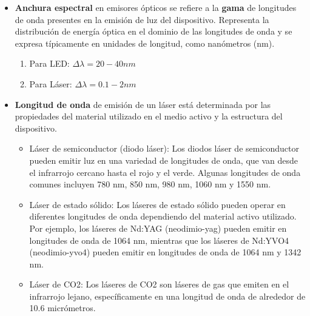 \documentclass[
	12pt, %
	fleqn, %
	a4paper, %
	oneside, %
]{LegrandOrangeBook}
\begin{document}
\begin{itemize}
\item \textbf{Anchura espectral} en emisores ópticos se refiere a la \textbf{gama} de longitudes de onda presentes en la emisión de luz del dispositivo. Representa la distribución de energía óptica en el dominio de las longitudes de onda y se expresa típicamente en unidades de longitud, como nanómetros (nm).
\begin{enumerate}
\item Para LED: $\Delta\lambda=20-40 nm$
\item Para Láser: $\Delta\lambda=0.1-2 nm$
\end{enumerate}
\item \textbf{Longitud de onda} de emisión de un láser está determinada por las propiedades del material utilizado en el medio activo y la estructura del dispositivo.
\begin{itemize}
\item Láser de semiconductor (diodo láser): Los diodos láser de semiconductor pueden emitir luz en una variedad de longitudes de onda, que van desde el infrarrojo cercano hasta el rojo y el verde. Algunas longitudes de onda comunes incluyen 780 nm, 850 nm, 980 nm, 1060 nm y 1550 nm.

\item Láser de estado sólido: Los láseres de estado sólido pueden operar en diferentes longitudes de onda dependiendo del material activo utilizado. Por ejemplo, los láseres de Nd:YAG (neodimio-yag) pueden emitir en longitudes de onda de 1064 nm, mientras que los láseres de Nd:YVO4 (neodimio-yvo4) pueden emitir en longitudes de onda de 1064 nm y 1342 nm.

\item Láser de CO2: Los láseres de CO2 son láseres de gas que emiten en el infrarrojo lejano, específicamente en una longitud de onda de alrededor de 10.6 micrómetros.


\end{itemize}
\end{itemize}
\end{document}
